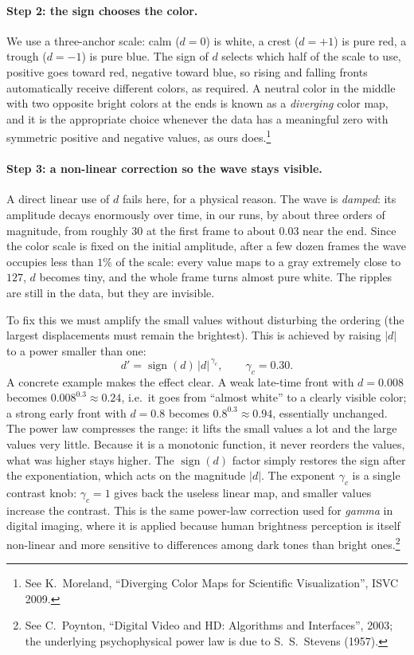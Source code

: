 \paragraph{Step 2: the sign chooses the color.}
We use a three-anchor scale: calm ($d=0$) is white, a crest ($d=+1$) is pure red,
a trough ($d=-1$) is pure blue. The sign of $d$ selects which half of the scale
to use, positive goes toward red, negative toward blue, so rising and falling
fronts automatically receive different colors, as required. A neutral color in
the middle with two opposite bright colors at the ends is known as a
\emph{diverging} color map, and it is the appropriate choice whenever the data
has a meaningful zero with symmetric positive and negative values, as ours
does.\footnote{See K.\ Moreland, ``Diverging Color Maps for Scientific
Visualization'', ISVC 2009.}

\paragraph{Step 3: a non-linear correction so the wave stays visible.}
A direct linear use of $d$ fails here, for a physical reason. The wave is
\emph{damped}: its amplitude decays enormously over time, in our runs, by about
three orders of magnitude, from roughly $30$ at the first frame to about $0.03$
near the end. Since the color scale is fixed on the initial amplitude, after a
few dozen frames the wave occupies less than $1\%$ of the scale: every value maps
to a gray extremely close to $127$, $d$ becomes tiny, and the whole frame turns
almost pure white. The ripples are still in the data, but they are invisible.

To fix this we must amplify the small values without disturbing the ordering
(the largest displacements must remain the brightest). This is achieved by
raising $|d|$ to a power smaller than one:
\begin{equation}
    d' = \operatorname{sign}(d)\,|d|^{\,\gamma_c},
    \qquad \gamma_c = 0.30.
    \label{eq:cuda-gamma}
\end{equation}
A concrete example makes the effect clear. A weak late-time front with $d=0.008$
becomes $0.008^{0.3}\approx 0.24$, i.e.\ it goes from ``almost white'' to a
clearly visible color; a strong early front with $d=0.8$ becomes
$0.8^{0.3}\approx 0.94$, essentially unchanged. The power law compresses the
range: it lifts the small values a lot and the large values very little. Because
it is a monotonic function, it never reorders the values, what was higher stays
higher. The $\operatorname{sign}(d)$ factor simply restores the sign after the
exponentiation, which acts on the magnitude $|d|$. The exponent $\gamma_c$ is a
single contrast knob: $\gamma_c=1$ gives back the useless linear map, and smaller
values increase the contrast. This is the same power-law correction used for
\emph{gamma} in digital imaging, where it is applied because human brightness
perception is itself non-linear and more sensitive to differences among dark
tones than bright ones.\footnote{See C.\ Poynton, ``Digital Video and HD:
Algorithms and Interfaces'', 2003; the underlying psychophysical power law is due
to S.\ S.\ Stevens (1957).}

